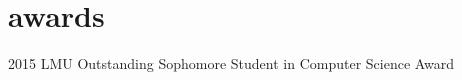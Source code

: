 \documentclass[]{friggeri-cv} %
\begin{document}

\section{awards}

  \begin{entrylist}
  

    \shortentry
      {2015}
      {LMU Outstanding Sophomore Student in Computer Science Award}
      
            
  \end{entrylist}
\end{document}
